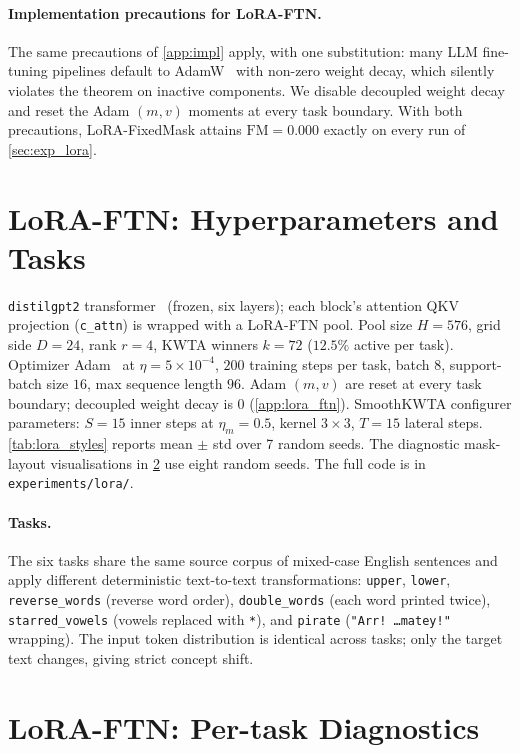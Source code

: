 \documentclass{article}
\theoremstyle{plain}
\theoremstyle{remark}
\begin{document}
\paragraph{Implementation precautions for LoRA-FTN.}
The same precautions of \cref{app:impl} apply, with one substitution: many LLM fine-tuning pipelines default to AdamW~\citep{loshchilov2019decoupled} with non-zero weight decay, which silently violates the theorem on inactive components. We disable decoupled weight decay and reset the Adam $(m,v)$ moments at every task boundary. With both precautions, LoRA-FixedMask attains $\mathrm{FM}=0.000$ exactly on every run of \cref{sec:exp_lora}.

\section{LoRA-FTN: Hyperparameters and Tasks}
\label{app:lora_hp}
\texttt{distilgpt2} transformer~\citep{radford2019language,sanh2019distilbert,wolf2020transformers,huggingface_distilgpt2} (frozen, six layers); each block's attention QKV projection (\texttt{c\_attn}) is wrapped with a LoRA-FTN pool. Pool size $H=576$, grid side $D=24$, rank $r=4$, KWTA winners $k=72$ ($12.5\%$ active per task). Optimizer Adam~\citep{kingma2015adam} at $\eta=5\times 10^{-4}$, $200$ training steps per task, batch $8$, support-batch size $16$, max sequence length $96$. Adam $(m,v)$ are reset at every task boundary; decoupled weight decay is $0$ (\cref{app:lora_ftn}). SmoothKWTA configurer parameters: $S=15$ inner steps at $\eta_m=0.5$, kernel $3\times 3$, $T=15$ lateral steps. \cref{tab:lora_styles} reports mean $\pm$ std over 7 random seeds. The diagnostic mask-layout visualisations in \cref{app:lora_results} use eight random seeds. The full code is in \texttt{experiments/lora/}.

\paragraph{Tasks.}
The six tasks share the same source corpus of mixed-case English sentences and apply different deterministic text-to-text transformations: \texttt{upper}, \texttt{lower}, \texttt{reverse\_words} (reverse word order), \texttt{double\_words} (each word printed twice), \texttt{starred\_vowels} (vowels replaced with \texttt{*}), and \texttt{pirate} (\texttt{"Arr! \ldots matey!"} wrapping). The input token distribution is identical across tasks; only the target text changes, giving strict concept shift.

\section{LoRA-FTN: Per-task Diagnostics}
\label{app:lora_results}
\end{document}

